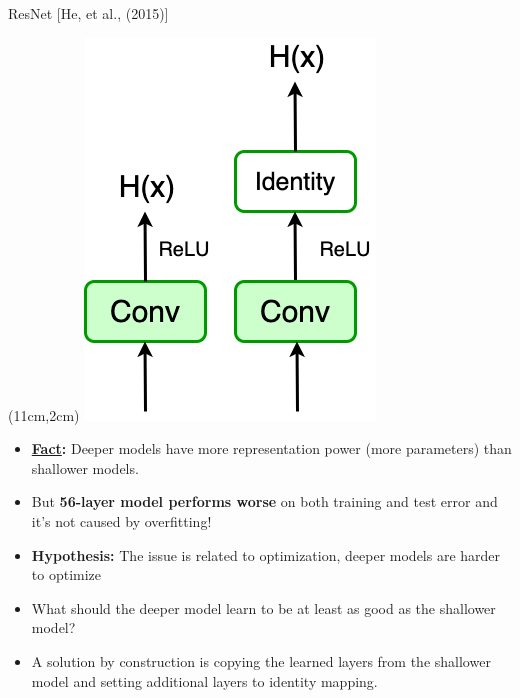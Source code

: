 \documentclass[serif, aspectratio=169]{beamer}
\begin{document}
\begin{frame}{ResNet [He, et al., (2015)]}
	
	\begin{textblock*}{5cm}(11cm,2cm) %
		\includegraphics[keepaspectratio, scale=0.4]{pic/Identity}
	\end{textblock*}
	
	\begin{itemize}
		\item \textbf{\underline{Fact}:} Deeper models have more representation \newline power (more parameters) than shallower models.
		\item But \textbf{56-layer model performs worse} on both training \newline and test error and it’s not caused by overfitting!
		\item \textbf{Hypothesis:} The issue is related to optimization, \newline deeper models are harder to optimize
		\item \color{red} What should the deeper model learn to be at least \newline as good as the shallower model?
		\item \color{red} A solution by construction is copying the learned \newline layers from the shallower model and setting additional \newline layers to identity mapping.
	\end{itemize}
\end{frame}
\end{document}
